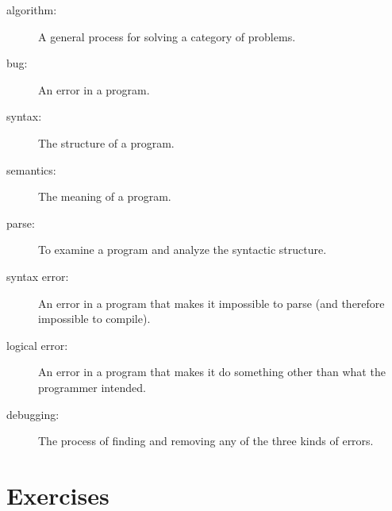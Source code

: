 \begin{description}
\item[algorithm:]  A general process for solving a category of
problems.

\item[bug:]  An error in a program.

\item[syntax:]  The structure of a program.

\item[semantics:]  The meaning of a program.

\item[parse:]  To examine a program and analyze the syntactic structure.

\item[syntax error:]  An error in a program that makes it impossible
to parse (and therefore impossible to compile).


\item[logical error:]  An error in a program that makes it do something
other than what the programmer intended.

\item[debugging:]  The process of finding and removing any of
the three kinds of errors.


\end{description}

\section{Exercises}



